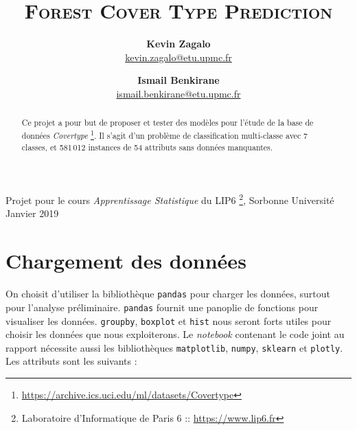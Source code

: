 \documentclass[12pt,a4paper]{article}
\title{\scshape \huge Forest Cover Type Prediction}
\author{\textbf{Kevin Zagalo} \\  \url{kevin.zagalo@etu.upmc.fr}  \and \textbf{Ismail Benkirane} \\ \url{ismail.benkirane@etu.upmc.fr}}
\date{}
\numberwithin{equation}{section}
\begin{document}
	\maketitle
	
{\small Projet pour le cours \textit{Apprentissage Statistique} du LIP6 \footnote[0]{Laboratoire d'Informatique de Paris 6 :: \url{https://www.lip6.fr}}, Sorbonne Université} \hfill Janvier 2019
	
	\hrulefill

	\begin{abstract}
		  Ce projet a pour but de proposer et tester des modèles pour l'étude de la base de données  \textit{Covertype} \footnote{\url{https://archive.ics.uci.edu/ml/datasets/Covertype}}. Il s'agit d'un problème de classification multi-classe avec 7 classes, et 581\,012 instances de 54 attributs sans données manquantes. 
	\end{abstract}

	\hrulefill

	\tableofcontents
	
	\newpage
	
	\section{Chargement des données}
	
	On choisit d'utiliser la bibliothèque \verb!pandas! pour charger les données, surtout pour l'analyse préliminaire. \verb!pandas! fournit une panoplie de fonctions pour visualiser les données. \verb!groupby!, \verb!boxplot! et \verb!hist! nous seront forts utiles pour choisir les données que nous exploiterons. Le \textit{notebook} contenant le code joint au rapport nécessite aussi les bibliothèques \verb!matplotlib!, \verb!numpy!, \verb!sklearn! et \verb!plotly!.\\
	
	Les attributs sont les suivants : 
	
\end{document}
